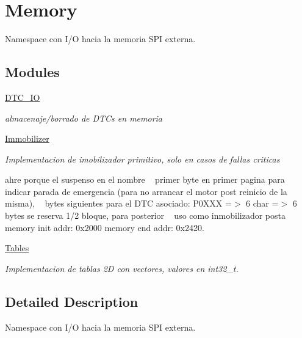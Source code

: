 \hypertarget{group__Memory}{}\section{Memory}
\label{group__Memory}


Namespace con I/O hacia la memoria S\+PI externa.  


\subsection*{Modules}
\begin{DoxyCompactItemize}
\item 
\hyperlink{group__DTC__IO}{D\+T\+C\+\_\+\+IO}
\begin{DoxyCompactList}\small\item\em almacenaje/borrado de D\+TC\textquotesingle{}s en memoria \end{DoxyCompactList}\item 
\hyperlink{group__Immobilizer}{Immobilizer}
\begin{DoxyCompactList}\small\item\em Implementacion de imobilizador primitivo, solo en casos de fallas criticas 

ahre porque el suspenso en el nombre ~\newline
primer byte en primer pagina para indicar parada de emergencia (para no arrancar el motor post reinicio de la misma), ~ bytes siguientes para el D\+TC asociado\+: P0\+X\+XX =$>$ 6 char =$>$ 6 bytes se reserva 1/2 bloque, para posterior ~\newline
 uso como inmobilizador posta memory init addr\+: 0x2000 memory end addr\+: 0x2420. \end{DoxyCompactList}\item 
\hyperlink{group__Tables}{Tables}
\begin{DoxyCompactList}\small\item\em Implementacion de tablas 2D con vectores, valores en int32\+\_\+t. \end{DoxyCompactList}\end{DoxyCompactItemize}


\subsection{Detailed Description}
Namespace con I/O hacia la memoria S\+PI externa. 

